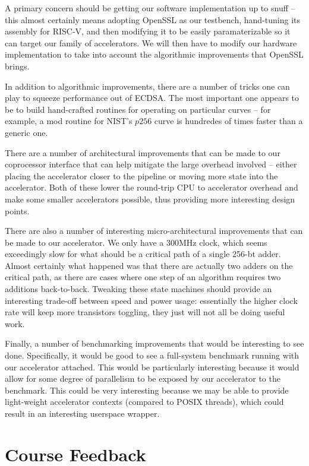 \documentclass[twocolumn]{article}
\begin{document}
A primary concern should be getting our software
implementation up to snuff -- this almost certainly means adopting
OpenSSL as our testbench, hand-tuning its assembly for RISC-V, and
then modifying it to be easily paramaterizable so it can target our
family of accelerators. We will then have to modify our hardware 
implementation to take into account the algorithmic improvements that 
OpenSSL brings.

In addition to algorithmic improvements, there are a number of tricks
one can play to squeeze performance out of ECDSA.  The most important
one appears to be to build hand-crafted routines for operating on
particular curves -- for example, a mod routine for NIST's $p256$
curve is hundredes of times faster than a generic
one\cite{nist-routines}.

There are a number of architectural improvements that can be made to
our coprocessor interface that can help mitigate the large overhead
involved -- either placing the accelerator closer to the pipeline or
moving more state into the accelerator.  Both of these lower the
round-trip CPU to accelerator overhead and make some smaller
accelerators possible, thus providing more interesting design points.

There are also a number of interesting micro-architectural
improvements that can be made to our accelerator.  We only have a
300MHz clock, which seems exceedingly slow for what should be a
critical path of a single 256-bt adder.  Almost certainly what
happened was that there are actually two adders on the critical path,
as there are cases where one step of an algorithm requires two
additions back-to-back.  Tweaking these state machines should provide
an interesting trade-off between speed and power usage: essentially
the higher clock rate will keep more transistors toggling, they just
will not all be doing useful work.

Finally, a number of benchmarking improvements that would be
interesting to see done.  Specifically, it would be good to see a
full-system benchmark running with our accelerator attached.  This
would be particularly interesting because it would allow for some
degree of parallelism to be exposed by our accelerator to the
benchmark.  This could be very interesting because we may be able to
provide light-weight accelerator contexts (compared to POSIX threads),
which could result in an interesting userspace wrapper.

\section{Course Feedback}
\end{document}
